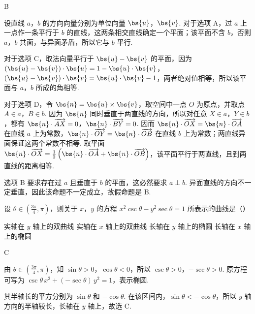 \documentclass[UTF8,a4paper,oneside,11pt]{ctexbook}
\begin{document}
\begin{answer}
B
\end{answer}

\begin{solution}
设直线 \(a\)，\(b\) 的方向向量分别为单位向量 \(\bs{u}\)，\(\bs{v}\). 对于选项 A，过 \(a\) 上一点作一条平行于 \(b\) 的直线，这两条相交直线确定一个平面；该平面不含 \(b\)，否则 \(a\)，\(b\) 共面，与异面矛盾，所以它与 \(b\) 平行.

对于选项 C，取法向量平行于 \(\bs{u}-\bs{v}\) 的平面，因为
\(\left(\bs{u}-\bs{v}\right)\cdot\bs{u}=1-\bs{u}\cdot\bs{v}\)，\(\left(\bs{u}-\bs{v}\right)\cdot\bs{v}=\bs{u}\cdot\bs{v}-1\)，两者绝对值相等，所以该平面与 \(a\)，\(b\) 所成的角相等.

对于选项 D，令 \(\bs{n}=\bs{u}\times\bs{v}\)，取空间中一点 \(O\) 为原点，并取点 \(A\in a\)，\(B\in b\). 因为 \(\bs{n}\) 同时垂直于两直线的方向，所以对任意 \(X\in a\)，\(Y\in b\)，都有 \(\bs{n}\cdot\overrightarrow{AX}=0\)，\(\bs{n}\cdot\overrightarrow{BY}=0\). 因而 \(\bs{n}\cdot\overrightarrow{OX}=\bs{n}\cdot\overrightarrow{OA}\) 在直线 \(a\) 上为常数，\(\bs{n}\cdot\overrightarrow{OY}=\bs{n}\cdot\overrightarrow{OB}\) 在直线 \(b\) 上为常数；两直线异面保证这两个常数不相等. 取平面
\(\bs{n}\cdot\overrightarrow{OX}=\frac{1}{2}\left(\bs{n}\cdot\overrightarrow{OA}+\bs{n}\cdot\overrightarrow{OB}\right)\)，该平面平行于两直线，且到两直线的距离相等.

选项 B 要求存在过 \(a\) 且垂直于 \(b\) 的平面，这必然要求 \(a\perp b\). 异面直线的方向不一定垂直，因此该命题不一定成立，故假命题是 B.
\end{solution}

\begin{problem}
设 \(\theta \in \left(\frac{3\pi}{4}, \pi\right)\)，则关于 \(x\)，\(y\) 的方程 \(x^2 \csc \theta - y^2 \sec \theta = 1\) 所表示的曲线是（\quad）

\choices
    {实轴在 \(y\) 轴上的双曲线}
    {实轴在 \(x\) 轴上的双曲线}
    {长轴在 \(y\) 轴上的椭圆}
    {长轴在 \(x\) 轴上的椭圆}
\end{problem}

\begin{answer}
C
\end{answer}

\begin{solution}
由 \(\theta\in\left(\frac{3\pi}{4},\pi\right)\)，知 \(\sin\theta>0\)，\(\cos\theta<0\)，所以 \(\csc\theta>0\)，\(-\sec\theta>0\). 原方程可写为
\(\csc\theta\,x^2+(-\sec\theta)\,y^2=1\)，表示椭圆.

其半轴长的平方分别为 \(\sin\theta\) 和 \(-\cos\theta\). 在该区间内，\(\sin\theta<-\cos\theta\)，所以 \(y\) 轴方向的半轴较长，长轴在 \(y\) 轴上，故选 C.
\end{solution}
\end{document}
